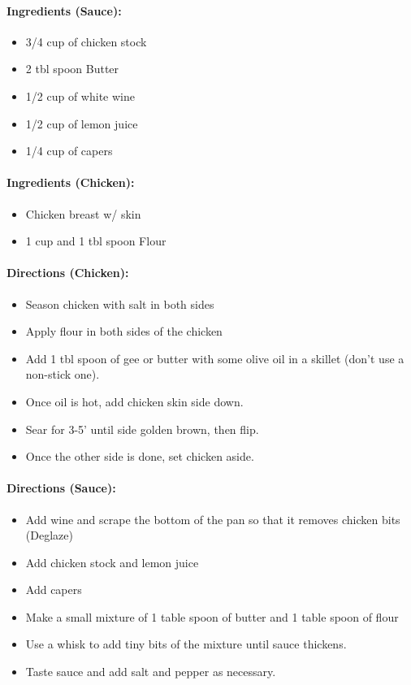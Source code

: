 \documentclass{article}
\begin{document}
\paragraph{Ingredients (Sauce):}
\begin{itemize}
    \item 3/4 cup of chicken stock
    \item 2 tbl spoon Butter
    \item 1/2 cup of white wine
    \item 1/2 cup of lemon juice
    \item 1/4 cup of capers
\end{itemize}  

\paragraph{Ingredients (Chicken):}
\begin{itemize}
    \item Chicken breast w/ skin
    \item 1 cup and 1 tbl spoon Flour
\end{itemize}  

\paragraph{Directions (Chicken):}
\begin{itemize}
    \item Season chicken with salt in both sides
    \item Apply flour in both sides of the chicken
    \item Add 1 tbl spoon of gee or butter with some olive oil in a skillet (don't use a non-stick one).
    \item Once oil is hot, add chicken skin side down.
    \item Sear for 3-5' until side golden brown, then flip.
    \item Once the other side is done, set chicken aside.
\end{itemize}  

\paragraph{Directions (Sauce):}
\begin{itemize}
    \item Add wine and scrape the bottom of the pan so that it removes chicken bits (Deglaze)
    \item Add chicken stock and lemon juice
    \item Add capers
    \item Make a small mixture of 1 table spoon of butter and 1 table spoon of flour
    \item Use a whisk to add tiny bits of the mixture until sauce thickens.
    \item Taste sauce and add salt and pepper as necessary.
\end{itemize} 
\end{document}
